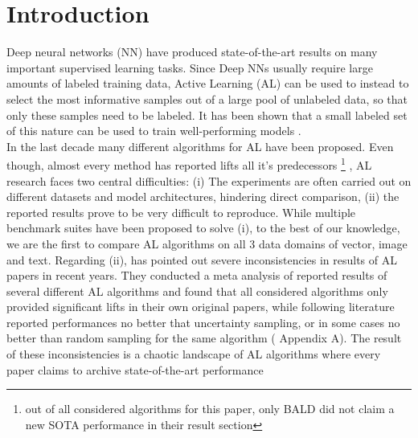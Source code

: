 \documentclass[]{article}
\begin{document}
\section{Introduction}
Deep neural networks (NN) have produced state-of-the-art results on many important supervised learning tasks.
Since Deep NNs usually require large amounts of labeled training data, Active Learning (AL) can be used to instead to select the most informative samples out of a large pool of unlabeled data, so that only these samples need to be labeled.
It has been shown that a small labeled set of this nature can be used to train well-performing models \cite{beck2021effective, hu2021towards, li2022empirical, zhou2021towards}. \\
In the last decade many different algorithms for AL have been proposed.
Even though, almost every method has reported lifts all it's predecessors 
\footnote{out of all considered algorithms for this paper, only BALD \cite{gal2017deep} did not claim a new SOTA performance in their result section}
, AL research faces two central difficulties:
(i) The experiments are often carried out on different datasets and model architectures, hindering direct comparison,
(ii) the reported results prove to be very difficult to reproduce.
While multiple benchmark suites have been proposed to solve (i), to the best of our knowledge, we are the first to compare AL algorithms on all 3 data domains of vector, image and text.
Regarding (ii), \cite{zhou2021towards} has pointed out severe inconsistencies in results of AL papers in recent years. 
They conducted a meta analysis of reported results of several different AL algorithms and found that all considered algorithms only provided significant lifts in their own original papers, while following literature reported performances no better that uncertainty sampling, or in some cases no better than random sampling for the same algorithm (\cite{zhou2021towards} Appendix A).
The result of these inconsistencies is a chaotic landscape of AL algorithms where every paper claims to archive state-of-the-art performance
\end{document}
